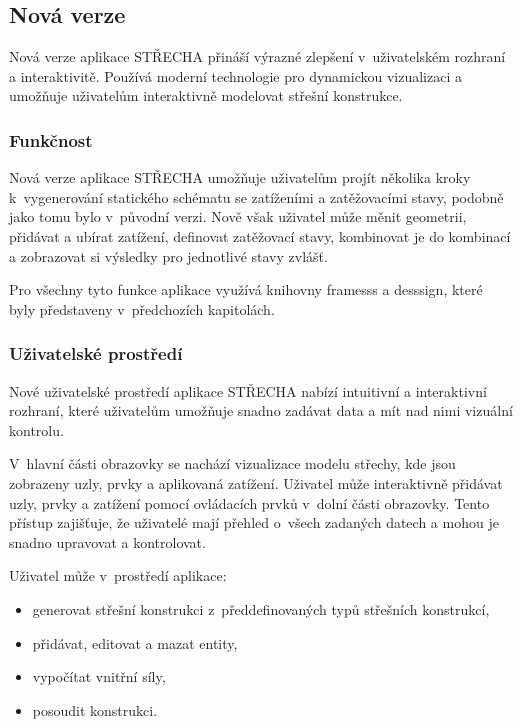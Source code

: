 \subsection{Nová verze}
Nová verze aplikace STŘECHA přináší výrazné zlepšení v~uživatelském rozhraní a interaktivitě. Používá moderní technologie pro dynamickou vizualizaci a umožňuje uživatelům interaktivně modelovat střešní konstrukce.

\subsubsection*{Funkčnost}
Nová verze aplikace STŘECHA umožňuje uživatelům projít několika kroky k~vygenerování statického schématu se zatíženími a zatěžovacími stavy, podobně jako tomu bylo v~původní verzi. Nově však uživatel může měnit geometrii, přidávat a ubírat zatížení, definovat zatěžovací stavy, kombinovat je do kombinací a zobrazovat si výsledky pro jednotlivé stavy zvlášť.

Pro všechny tyto funkce aplikace využívá knihovny framesss a desssign, které byly představeny v~předchozích kapitolách.

\subsubsection*{Uživatelské prostředí}
Nové uživatelské prostředí aplikace STŘECHA nabízí intuitivní a interaktivní rozhraní, které uživatelům umožňuje snadno zadávat data a mít nad nimi vizuální kontrolu.

V~hlavní části obrazovky se nachází vizualizace modelu střechy, kde jsou zobrazeny uzly, prvky a aplikovaná zatížení. Uživatel může interaktivně přidávat uzly, prvky a zatížení pomocí ovládacích prvků v~dolní části obrazovky. Tento přístup zajišťuje, že uživatelé mají přehled o~všech zadaných datech a mohou je snadno upravovat a kontrolovat.

Uživatel může v~prostředí aplikace:
\begin{itemize}
    \item generovat střešní konstrukci z~předdefinovaných typů střešních konstrukcí,
    \item přidávat, editovat a mazat entity,
    \item vypočítat vnitřní síly,
    \item posoudit konstrukci.
\end{itemize}

